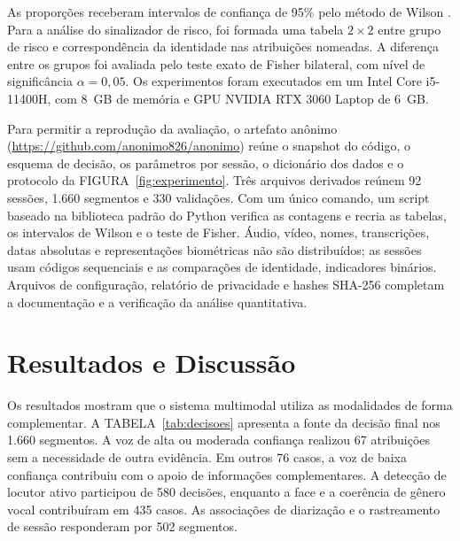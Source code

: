 \documentclass[a4paper,11pt]{article}
\begin{document}
As proporções receberam intervalos de confiança de 95\% pelo método de Wilson \cite{wilson1927}. Para a análise do sinalizador de risco, foi formada uma tabela $2\times2$ entre grupo de risco e correspondência da identidade nas atribuições nomeadas. A diferença entre os grupos foi avaliada pelo teste exato de Fisher bilateral, com nível de significância $\alpha=0{,}05$. Os experimentos foram executados em um Intel Core i5-11400H, com 8~GB de memória e GPU NVIDIA RTX 3060 Laptop de 6~GB.

Para permitir a reprodução da avaliação, o artefato anônimo (\url{https://github.com/anonimo826/anonimo}) reúne o snapshot do código, o esquema de decisão, os parâmetros por sessão, o dicionário dos dados e o protocolo da FIGURA~\ref{fig:experimento}. Três arquivos derivados reúnem 92 sessões, 1.660 segmentos e 330 validações. Com um único comando, um script baseado na biblioteca padrão do Python verifica as contagens e recria as tabelas, os intervalos de Wilson e o teste de Fisher. Áudio, vídeo, nomes, transcrições, datas absolutas e representações biométricas não são distribuídos; as sessões usam códigos sequenciais e as comparações de identidade, indicadores binários. Arquivos de configuração, relatório de privacidade e hashes SHA-256 completam a documentação e a verificação da análise quantitativa.

\section*{Resultados e Discussão}

Os resultados mostram que o sistema multimodal utiliza as modalidades de forma complementar. A TABELA~\ref{tab:decisoes} apresenta a fonte da decisão final nos 1.660 segmentos. A voz de alta ou moderada confiança realizou 67 atribuições sem a necessidade de outra evidência. Em outros 76 casos, a voz de baixa confiança contribuiu com o apoio de informações complementares. A detecção de locutor ativo participou de 580 decisões, enquanto a face e a coerência de gênero vocal contribuíram em 435 casos. As associações de diarização e o rastreamento de sessão responderam por 502 segmentos.
\end{document}
